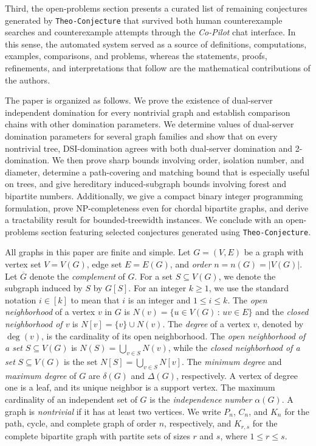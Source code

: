 \documentclass[11pt]{article}
\theoremstyle{definition}
\theoremstyle{remark}
\newcommand{\barG}{\overline{G}}
\DeclareRobustCommand{\TheoConjecture}{\texttt{Theo-Conjecture}}
\DeclareRobustCommand{\CoPilot}{\emph{Co-Pilot}}
\begin{document}
Third, the open-problems section presents a curated list of remaining
conjectures generated by \TheoConjecture{} that survived both human
counterexample searches and counterexample attempts through the \CoPilot{}
chat interface. In this sense, the automated system served as a source of
definitions, computations, examples, comparisons, and problems, whereas the
statements, proofs, refinements, and interpretations that follow are the
mathematical contributions of the authors.




The paper is organized as follows. We prove the existence of dual-server independent domination 
for every nontrivial graph and establish comparison chains with other domination parameters. We determine values of dual-server domination parameters for several graph families and show that
on every nontrivial tree, DSI-domination agrees with both dual-server
domination and 2-domination. We then prove sharp bounds involving order,
isolation number, and diameter, determine a path-covering and matching bound
that is especially useful on trees, and give hereditary induced-subgraph
bounds involving forest and bipartite numbers.   Additionally, we give a compact
binary integer programming formulation, prove NP-completeness even for
chordal bipartite graphs, and derive a tractability result for bounded-treewidth instances.  We conclude with an 
open-problems section featuring selected conjectures  generated using \TheoConjecture{}.


All graphs in this paper are finite and simple. Let \(G=(V,E)\) be a graph
with vertex set \(V=V(G)\), edge set \(E=E(G)\), and \emph{order}
\(n=n(G)=|V(G)|\).  Let $\barG$ denote the \emph{complement} of $G$.
For a set \(S\subseteq V(G)\), we denote the subgraph induced by \(S\) by
\(G[S]\). For an integer \(k\ge 1\), we use the standard notation
\(i\in [k]\) to mean that \(i\) is an integer and \(1\le i\le k\).
The \emph{open neighborhood} of a vertex $v$ in $G$ is $N(v) = \{u \in V(G) \, \colon \, uv \in E\}$ and the \emph{closed neighborhood of $v$} is $N[v] = \{v\} \cup N(v)$.  The \emph{degree} of a vertex \(v\),  denoted by
\(\deg(v)\), is the cardinality of its open neighborhood.
The \emph{open neighborhood of a set} $S \subseteq V(G)$ is $N(S) = \bigcup_{v \in S}N(v)$, while the \emph{closed neighborhood of a set} $S\subseteq V(G)$ is the set $N[S] = \bigcup_{v \in S} N[v]$.  The \emph{minimum degree} and \emph{maximum degree} of \(G\) are
\(\delta(G)\) and \(\Delta(G)\), respectively. A vertex of degree one is a leaf, and its
unique neighbor is a support vertex.   The maximum cardinality of an independent set of $G$ is the \emph{independence number} \(\alpha(G)\).
A graph is \emph{nontrivial} if it has at least
two vertices. We write \(P_n\), \(C_n\), and \(K_n\) for the path, cycle, and
complete graph of order \(n\), respectively, and \(K_{r,s}\) for the complete
bipartite graph with partite sets of sizes \(r\) and \(s\), where
\(1\le r\le s\).  
\end{document}
